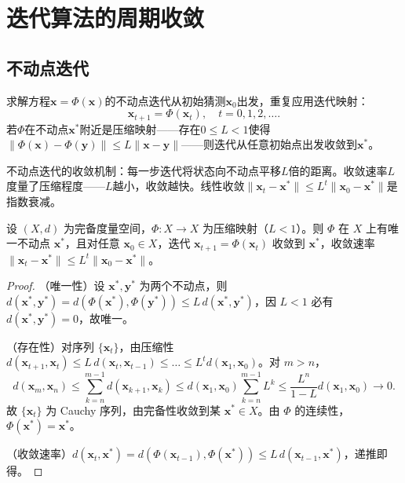 \section{迭代算法的周期收敛}

\subsection{不动点迭代}

\begin{definition}[不动点迭代]\label{def:fixed_point_iteration}
求解方程$\mathbf{x} = \Phi(\mathbf{x})$的不动点迭代从初始猜测$\mathbf{x}_0$出发，重复应用迭代映射：
\[
\mathbf{x}_{t+1} = \Phi(\mathbf{x}_t), \quad t = 0, 1, 2, \dots.
\]
若$\Phi$在不动点$\mathbf{x}^*$附近是压缩映射——存在$0 \le L < 1$使得$\|\Phi(\mathbf{x}) - \Phi(\mathbf{y})\| \le L \|\mathbf{x} - \mathbf{y}\|$——则迭代从任意初始点出发收敛到$\mathbf{x}^*$。

不动点迭代的收敛机制：每一步迭代将状态向不动点平移$L$倍的距离。收敛速率$L$度量了压缩程度——$L$越小，收敛越快。线性收敛$\|\mathbf{x}_t - \mathbf{x}^*\| \le L^t \|\mathbf{x}_0 - \mathbf{x}^*\|$是指数衰减。
\end{definition}

\begin{theorem}\label{thm:banach_fixed_point_algo}
设 $(X, d)$ 为完备度量空间，$\Phi: X \to X$ 为压缩映射（$L < 1$）。则 $\Phi$ 在 $X$ 上有唯一不动点 $\mathbf{x}^*$，且对任意 $\mathbf{x}_0 \in X$，迭代 $\mathbf{x}_{t+1} = \Phi(\mathbf{x}_t)$ 收敛到 $\mathbf{x}^*$，收敛速率 $\|\mathbf{x}_t - \mathbf{x}^*\| \le L^t \|\mathbf{x}_0 - \mathbf{x}^*\|$。
\end{theorem}

\begin{proof}
（唯一性）设 $\mathbf{x}^*, \mathbf{y}^*$ 为两个不动点，则 $d(\mathbf{x}^*, \mathbf{y}^*) = d(\Phi(\mathbf{x}^*), \Phi(\mathbf{y}^*)) \le L\, d(\mathbf{x}^*, \mathbf{y}^*)$，因 $L < 1$ 必有 $d(\mathbf{x}^*, \mathbf{y}^*) = 0$，故唯一。

（存在性）对序列 $\{\mathbf{x}_t\}$，由压缩性 $d(\mathbf{x}_{t+1}, \mathbf{x}_t) \le L\, d(\mathbf{x}_t, \mathbf{x}_{t-1}) \le \dots \le L^t d(\mathbf{x}_1, \mathbf{x}_0)$。对 $m > n$，
\[
d(\mathbf{x}_m, \mathbf{x}_n) \le \sum_{k=n}^{m-1} d(\mathbf{x}_{k+1}, \mathbf{x}_k) \le d(\mathbf{x}_1, \mathbf{x}_0) \sum_{k=n}^{m-1} L^k \le \frac{L^n}{1-L} d(\mathbf{x}_1, \mathbf{x}_0) \to 0.
\]
故 $\{\mathbf{x}_t\}$ 为 Cauchy 序列，由完备性收敛到某 $\mathbf{x}^* \in X$。由 $\Phi$ 的连续性，$\Phi(\mathbf{x}^*) = \mathbf{x}^*$。

（收敛速率）$d(\mathbf{x}_t, \mathbf{x}^*) = d(\Phi(\mathbf{x}_{t-1}), \Phi(\mathbf{x}^*)) \le L\, d(\mathbf{x}_{t-1}, \mathbf{x}^*)$，递推即得。
\end{proof}

